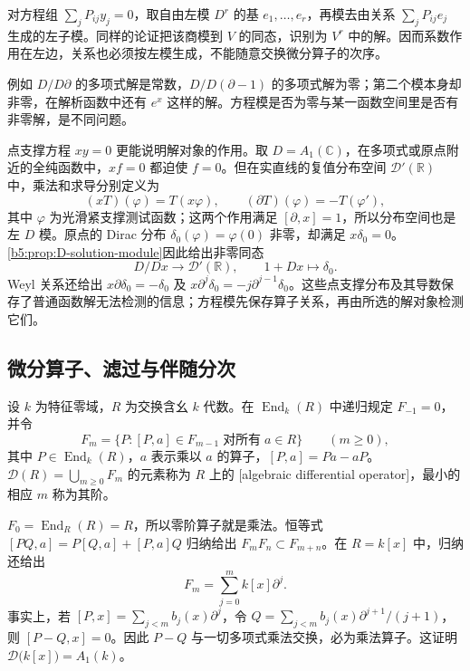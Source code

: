 对方程组 \(\sum_jP_{ij}y_j=0\)，取自由左模 \(D^r\) 的基 \(e_1,\ldots,e_r\)，再模去由关系 \(\sum_jP_{ij}e_j\) 生成的左子模。同样的论证把该商模到 \(V\) 的同态，识别为 \(V^r\) 中的解。因而系数作用在左边，关系也必须按左模生成，不能随意交换微分算子的次序。

\ProseParagraphBreak
例如 \(D/D\partial\) 的多项式解是常数，\(D/D(\partial-1)\) 的多项式解为零；第二个模本身却非零，在解析函数中还有 \(e^x\) 这样的解。方程模是否为零与某一函数空间里是否有非零解，是不同问题。

\ProseParagraphBreak
点支撑方程 \(xy=0\) 更能说明解对象的作用。取 \(D=A_1(\mathbb C)\)，在多项式或原点附近的全纯函数中，\(xf=0\) 都迫使 \(f=0\)。但在实直线的复值分布空间 \(\mathcal D'(\mathbb R)\) 中，乘法和求导分别定义为
\[
	(xT)(\varphi)=T(x\varphi),\qquad (\partial T)(\varphi)=-T(\varphi'),
\]
其中 \(\varphi\) 为光滑紧支撑测试函数；这两个作用满足 \([\partial,x]=1\)，所以分布空间也是左 \(D\) 模。原点的 Dirac 分布 \(\delta_0(\varphi)=\varphi(0)\) 非零，却满足 \(x\delta_0=0\)。\cref{b5:prop:D-solution-module}因此给出非零同态
\[
	D/Dx\longrightarrow\mathcal D'(\mathbb R),\qquad 1+Dx\longmapsto\delta_0.
\]
Weyl 关系还给出 \(x\partial\delta_0=-\delta_0\) 及 \(x\partial^j\delta_0=-j\partial^{j-1}\delta_0\)。这些点支撑分布及其导数保存了普通函数解无法检测的信息；方程模先保存算子关系，再由所选的解对象检测它们。

\subsection{微分算子、滤过与伴随分次}
\label{b5:subsec:D01:02}

\begin{definition}\label{b5:def:D-operator-order}
	设 \(k\) 为特征零域，\(R\) 为交换含幺 \(k\) 代数。在 \(\operatorname{End}_k(R)\) 中递归规定 \(F_{-1}=0\)，并令
	\[
		F_m=\bigl\{P:[P,a]\in F_{m-1}\;\text{对所有}\;a\in R\bigr\}\qquad(m\ge0),
	\]
	其中 \(P\in\operatorname{End}_k(R)\)，\(a\) 表示乘以 \(a\) 的算子，\([P,a]=Pa-aP\)。\(\mathcal D(R)=\bigcup_{m\ge0}F_m\) 的元素称为 \(R\) 上的 [algebraic differential operator]，最小的相应 \(m\) 称为其阶。
\end{definition}

\(F_0=\operatorname{End}_R(R)=R\)，所以零阶算子就是乘法。恒等式 \([PQ,a]=P[Q,a]+[P,a]Q\) 归纳给出 \(F_mF_n\subset F_{m+n}\)。在 \(R=k[x]\) 中，归纳还给出
\[
	F_m=\sum_{j=0}^m k[x]\partial^j.
\]
事实上，若 \([P,x]=\sum_{j<m}b_j(x)\partial^j\)，令 \(Q=\sum_{j<m}b_j(x)\partial^{j+1}/(j+1)\)，则 \([P-Q,x]=0\)。因此 \(P-Q\) 与一切多项式乘法交换，必为乘法算子。这证明 \(\mathcal D\bigl(k[x]\bigr)=A_1(k)\)。

